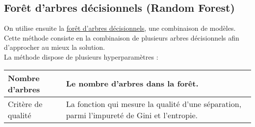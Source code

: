 \subsection{Forêt d'arbres décisionnels (Random Forest)}

On utilise ensuite la \href{https://scikit-learn.org/stable/modules/generated/sklearn.ensemble.RandomForestClassifier.html}{forêt d'arbres décisionnels}, une combinaison de modèles. Cette méthode consiste en la combinaison de plusieurs arbres décisionnels afin d'approcher au mieux la solution.\\

La méthode dispose de plusieurs hyperparamètres :

\noindent
\begin{tabularx}{\textwidth}{|X|X|}
    \hline
    Nombre d'arbres  & Le nombre d'arbres dans la forêt.\\\hline
    Critère de qualité & La fonction qui mesure la qualité d'une séparation, parmi l'impureté de Gini et l'entropie. \\\hline
\end{tabularx}